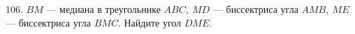 106. $BM$ --- медиана в треугольнике $ABC,\ MD$ --- биссектриса угла $AMB,\ ME$ --- биссектриса угла $BMC.$ Найдите угол $DME.$\\

